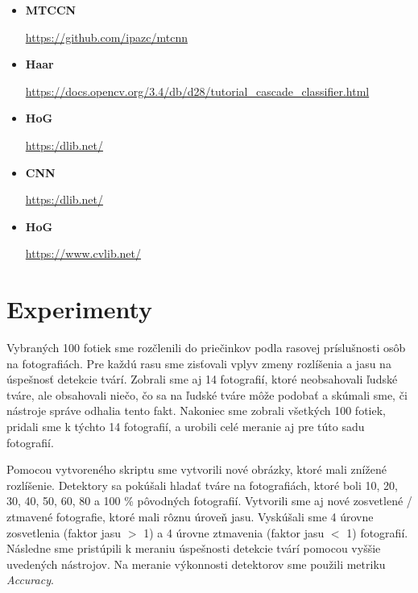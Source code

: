 \documentclass[]{article}
\begin{document}
	\begin{itemize}
		\item \textbf{MTCCN}
		
		\url{https://github.com/ipazc/mtcnn}
		
		\item \textbf{Haar}
		
		\url{https://docs.opencv.org/3.4/db/d28/tutorial_cascade_classifier.html}
		
		\item \textbf{HoG}
		
		\url{https:/dlib.net/}
		
		\item \textbf{CNN}
		
		\url{https:/dlib.net/}
		
		\item \textbf{HoG}
		
		\url{https://www.cvlib.net/}
	\end{itemize}
	
	\section{Experimenty}
	
	Vybraných 100 fotiek sme rozčlenili do priečinkov podla rasovej príslušnosti osôb na fotografiách. Pre každú rasu sme zisťovali vplyv zmeny rozlíšenia a jasu na úspešnosť detekcie tvárí. Zobrali sme aj 14 fotografií, ktoré neobsahovali ľudské tváre, ale obsahovali niečo, čo sa na ľudské tváre môže podobať a skúmali sme, či nástroje správe odhalia tento fakt. Nakoniec sme zobrali všetkých 100 fotiek, pridali sme k týchto 14 fotografií, a urobili celé meranie aj pre túto sadu fotografií.
	
	Pomocou vytvoreného skriptu sme vytvorili nové obrázky, ktoré mali znížené rozlíšenie. Detektory sa pokúšali hladať tváre na fotografiách, ktoré boli 10, 20, 30, 40, 50, 60, 80 a 100 \% pôvodných fotografií. Vytvorili sme aj nové zosvetlené / ztmavené fotografie, ktoré mali rôznu úroveň jasu. Vyskúšali sme 4 úrovne zosvetlenia (faktor jasu $>$ 1) a 4 úrovne ztmavenia (faktor jasu $<$ 1) fotografií. Následne sme pristúpili k meraniu úspešnosti detekcie tvárí pomocou vyššie uvedených nástrojov. Na meranie výkonnosti detektorov sme použili metriku \textit{Accuracy}.
	
\end{document}
